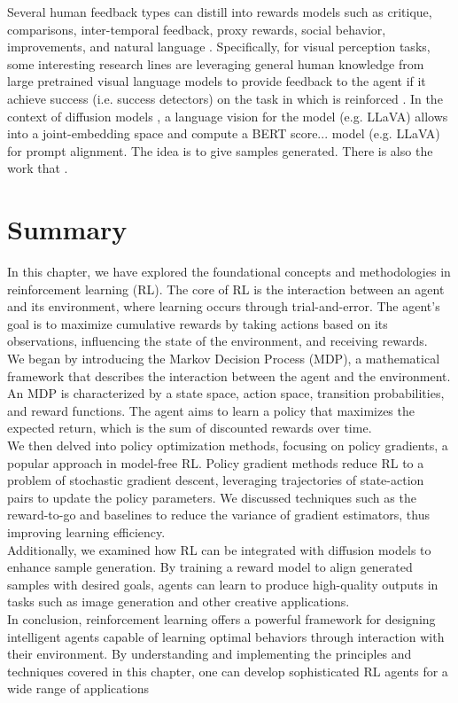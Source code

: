 \noindent Several human feedback types can distill into rewards models such as critique, comparisons, inter-temporal feedback, proxy rewards, social behavior, improvements, and natural language \cite{kaufmann2023survey}. Specifically,
for visual perception tasks, some interesting research lines are leveraging general human knowledge from large pretrained visual language models to provide feedback to the agent if it achieve success (i.e. success detectors) on the task in which is reinforced \cite{du2023visionlanguagemodelssuccessdetectors}. In the context of diffusion models \cite{black2023training}, a language vision for the model (e.g. LLaVA) allows into a joint-embedding space and compute a BERT score... model (e.g. LLaVA) for prompt alignment. The idea is to give samples generated. There is also the work that \cite{lee2023aligning}.


\section{Summary}

In this chapter, we have explored the foundational concepts and methodologies in reinforcement learning (RL). The core of RL is the interaction between an agent and its environment, where learning occurs through trial-and-error. The agent's goal is to maximize cumulative rewards by taking actions based on its observations, influencing the state of the environment, and receiving rewards. \\

\noindent We began by introducing the Markov Decision Process (MDP), a mathematical framework that describes the interaction between the agent and the environment. An MDP is characterized by a state space, action space, transition probabilities, and reward functions. The agent aims to learn a policy that maximizes the expected return, which is the sum of discounted rewards over time. \\

\noindent We then delved into policy optimization methods, focusing on policy gradients, a popular approach in model-free RL. Policy gradient methods reduce RL to a problem of stochastic gradient descent, leveraging trajectories of state-action pairs to update the policy parameters. We discussed techniques such as the reward-to-go and baselines to reduce the variance of gradient estimators, thus improving learning efficiency. \\

\noindent Additionally, we examined how RL can be integrated with diffusion models to enhance sample generation. By training a reward model to align generated samples with desired goals, agents can learn to produce high-quality outputs in tasks such as image generation and other creative applications. \\

\noindent In conclusion, reinforcement learning offers a powerful framework for designing intelligent agents capable of learning optimal behaviors through interaction with their environment. By understanding and implementing the principles and techniques covered in this chapter, one can develop sophisticated RL agents for a wide range of applications \\